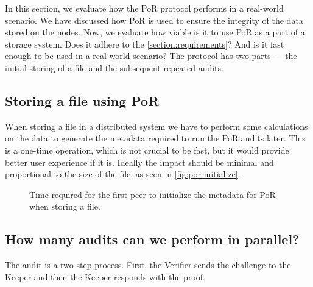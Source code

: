 In this section, we evaluate how the PoR protocol performs in a real-world scenario.
We have discussed how PoR is used to ensure the integrity of the data stored on the nodes.
Now, we evaluate how viable is it to use PoR as a part of a storage system.
Does it adhere to the \autoref{section:requirements}?
And is it fast enough to be used in a real-world scenario?
The protocol has two parts --- the initial storing of a file and the subsequent repeated audits.

\subsection{Storing a file using PoR}

When storing a file in a distributed system we have to perform some calculations on the data
to generate the metadata required to run the PoR audits later.
This is a one-time operation, which is not crucial to be fast,
but it would provide better user experience if it is.
Ideally the impact should be minimal and proportional to the size of the file,
as seen in \autoref{fig:por-initialize}.

\begin{figure}
  \myfloatalign
  \caption{Time required for the first peer to initialize the metadata for PoR when storing a file.}
  \label{fig:por-initialize}
\end{figure}

\subsection{How many audits can we perform in parallel?}

The audit is a two-step process.
First, the Verifier sends the challenge to the Keeper and then the Keeper responds with the proof.

